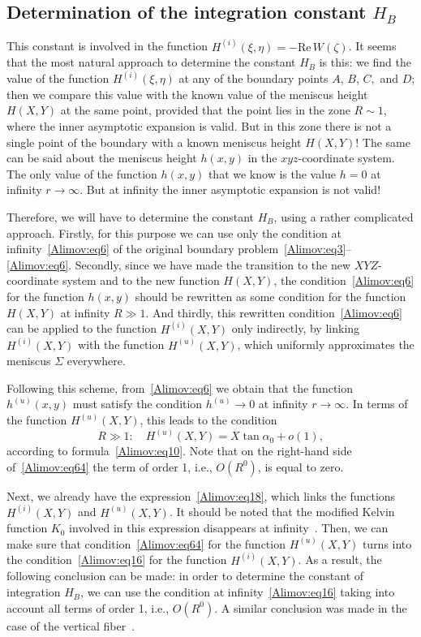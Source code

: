 \documentclass[
11pt,%
tightenlines,%
twoside,%
onecolumn,%
nofloats,%
nobibnotes,%
nofootinbib,%
superscriptaddress,%
noshowpacs,%
centertags]%
{revtex4-2}
\begin{document}
\subsection{Determination of the integration constant $H_B$}
This constant is involved in the function $H^{(i)}(\xi, \eta) = - \mbox{Re}\, W(\zeta)$. It seems
that the most natural approach to determine the constant $H_B$ is this: we find the value of the
function $H^{(i)}(\xi ,\eta)$ at any of the boundary points $A$, $B$, $C,$ and $D$; then we compare
this value with the known value of the meniscus height $H(X,Y)$ at the same point, provided that
the point lies in the zone $R \sim 1$, where the inner asymptotic expansion is valid. But in this
zone there is not a single point of the boundary with a known meniscus height $H(X,Y)$! The same
can be said about the meniscus height $h(x,y)$ in the $xyz$-coordinate system. The only value of
the function $h(x,y)$ that we know is the value $h = 0$ at infinity $r \to \infty $. But at
infinity the inner asymptotic expansion is not valid!

Therefore, we will have to determine the constant $H_B$, using a rather complicated approach.
Firstly, for this purpose we can use only the condition at infinity~\eqref{Alimov:eq6} of the
original boundary problem~\eqref{Alimov:eq3}--\eqref{Alimov:eq6}. Secondly, since we have made the
transition to the new $XYZ$-coordinate system and to the new function $H(X,Y)$, the
condition~\eqref{Alimov:eq6} for the function $h(x,y)$ should be rewritten as some condition for
the function $H(X,Y)$ at infinity $R \gg 1$. And thirdly, this rewritten
condition~\eqref{Alimov:eq6} can be applied to the function $H^{(i)}(X,Y)$ only indirectly, by
linking $H^{(i)}(X,Y)$ with the function $H^{(u)}(X,Y)$, which uniformly approximates the meniscus
$\Sigma $ everywhere.

Following this scheme, from~\eqref{Alimov:eq6} we obtain that the function $h^{(u)}(x,y)$ must
satisfy the condition $h^{(u)} \to 0$ at infinity $r \to \infty$. In terms of the function
$H^{(u)}(X,Y)$, this leads to the condition
\begin{equation}
\label{Alimov:eq64} R \gg 1: \quad H^{(u)}(X,Y) = X\tan \alpha_0 + o(1),
\end{equation}
 according to formula~\eqref{Alimov:eq10}. Note that on the right-hand side
of~\eqref{Alimov:eq64} the term of order 1, i.e., $O(R^0)$, is equal to zero.

Next, we already have the expression~\eqref{Alimov:eq18}, which links the functions $H^{(i)}(X,Y)$
and $H^{(u)}(X,Y)$. It should be noted that the modified Kelvin function $K_0$ involved in this
expression disappears at infinity~\cite{Alimov:bib14}. Then, we can make sure that
condition~\eqref{Alimov:eq64} for the function $H^{(u)}(X,Y)$ turns into the
condition~\eqref{Alimov:eq16} for the function $H^{(i)}(X,Y)$. As a result, the following
conclusion can be made: in order to determine the constant of integration $H_B$, we can use the
condition at infinity~\eqref{Alimov:eq16} taking into account all terms of order 1, i.e., $O(R^0)$.
A similar conclusion was made in the case of the vertical fiber~\cite{Alimov:bib5}.
\end{document}

